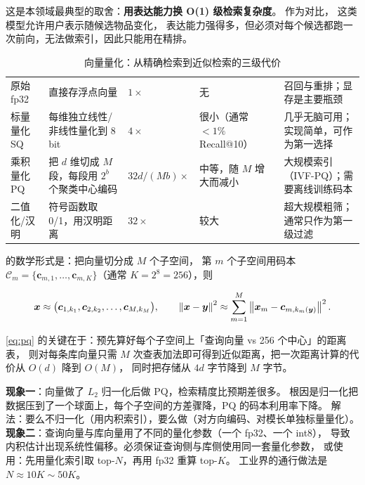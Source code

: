 这是本领域最典型的取舍：\textbf{用表达能力换 O(1) 级检索复杂度}。
作为对比， \cite{zhou2018din} 这类模型允许用户表示随候选物品变化，
表达能力强得多，但必须对每个候选都跑一次前向，无法做索引，因此只能用在精排。

\begin{table}[htbp]
\centering
\caption{向量量化：从精确检索到近似检索的三级代价}
\label{tab:quantization}
\small
\begin{tabularx}{\textwidth}{L{2.1cm} L{2.0cm} L{1.9cm} L{1.6cm} Y}
\toprule
{} &  &  &  &  \\
\midrule
原始 fp32 & 直接存浮点向量 & $1\times$ & 无 & 召回与重排；显存是主要瓶颈 \\
\addlinespace
标量量化 SQ & 每维独立线性/非线性量化到 8 bit & $4\times$ & 很小（通常 $<1\%$ Recall@10） & 几乎无脑可用；实现简单，可作为第一选择 \\
\addlinespace
乘积量化 PQ & 把 $d$ 维切成 $M$ 段，每段用 $2^{b}$ 个聚类中心编码 & $32d/(Mb)\times$ & 中等，随 $M$ 增大而减小 & 大规模索引（IVF-PQ）；需要离线训练码本 \\
\addlinespace
二值化/汉明 & 符号函数取 0/1，用汉明距离 & $32\times$ & 较大 & 超大规模粗筛；通常只作为第一级过滤 \\
\bottomrule
\end{tabularx}
\end{table}

 的数学形式是：把向量切分成 $M$ 个子空间，
第 $m$ 个子空间用码本 $\mathcal{C}_m = \{\bm{c}_{m,1},\dots,\bm{c}_{m,K}\}$（通常 $K = 2^8 = 256$），则

\begin{equation}
\bm{x} \approx \big(\bm{c}_{1,k_1}, \bm{c}_{2,k_2}, \dots, \bm{c}_{M,k_M}\big),
\qquad
\left\lVert \bm{x} - \bm{y} \right\rVert^2 \approx \sum_{m=1}^{M} \left\lVert \bm{x}_m - \bm{c}_{m,k_m(\bm{y})} \right\rVert^2 .
\label{eq:pq}
\end{equation}

\cref{eq:pq} 的关键在于：预先算好每个子空间上「查询向量 vs 256 个中心」的距离表，
则对每条库向量只需 $M$ 次查表加法即可得到近似距离，把一次距离计算的代价从 $O(d)$ 降到 $O(M)$，
同时把存储从 $4d$ 字节降到 $M$ 字节。

\begin{pitfall}[归一化与量化一起用时的两个坑]
\textbf{现象一}：向量做了 $L_2$ 归一化后做 PQ，检索精度比预期差很多。
根因是归一化把数据压到了一个球面上，每个子空间的方差骤降，PQ 的码本利用率下降。
解法：要么不归一化（用内积索引），要么做（对方向编码、对模长单独标量量化）。
\textbf{现象二}：查询向量与库向量用了不同的量化参数（一个 fp32、一个 int8），
导致内积估计出现系统性偏移。必须保证查询侧与库侧使用同一套量化参数，
或使用：先用量化索引取 top-$N$，再用 fp32 重算 top-$K$。
工业界的通行做法是 $N \approx 10K \sim 50K$。
\end{pitfall}

